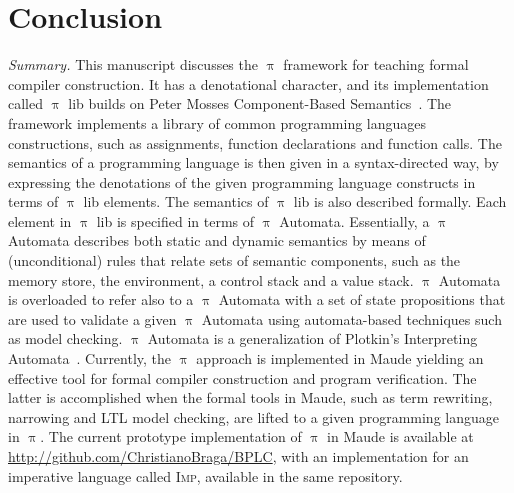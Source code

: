 \documentclass[a4paper,openany]{book}
\begin{document}
\chapter{Conclusion}\label{sec:conclusion}

\emph{Summary.} This manuscript discusses the $\uppi$ framework for teaching formal compiler construction. It has a denotational character, and its implementation called $\uppi$ lib builds on Peter Mosses Component-Based Semantics~\cite{Mosses:2004:FCF}. The framework implements a library of common programming languages constructions, such as assignments, function declarations and function calls. The semantics of a programming language is then given in a syntax-directed way, by expressing the denotations of the given programming language constructs in terms of $\uppi$ lib elements. The semantics of $\uppi$ lib is also described formally. Each element in $\uppi$ lib is specified in terms of $\uppi$ Automata. Essentially, a $\uppi$ Automata describes both static and dynamic semantics by means of (unconditional) rules that relate sets of semantic components, such as the memory store, the environment, a control stack and a value stack. 
$\uppi$ Automata is overloaded to refer also to a $\uppi$ Automata with a set of state propositions that are used to validate a given $\uppi$ Automata using automata-based techniques such as model checking.
$\uppi$ Automata is a generalization of Plotkin's Interpreting Automata~\cite{plotkin}. 
%
Currently, the $\uppi$ approach is implemented in Maude yielding an effective tool for formal compiler construction and program verification. The latter is accomplished when the formal tools in Maude, such as term rewriting, narrowing and LTL model checking, are lifted to a given programming language in $\uppi$. The current prototype implementation of $\uppi$ in Maude is available at \url{http://github.com/ChristianoBraga/BPLC}, with an implementation for an imperative language called \textsc{Imp}, available in the same repository. 
\end{document}

